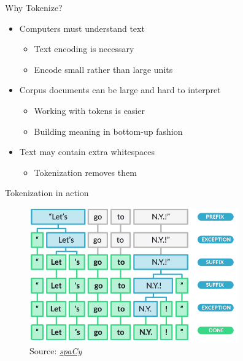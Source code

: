 \begin{vbframe}{Why Tokenize?}

\vfill

\begin{itemize}
	\item Computers must understand text
		\begin{itemize}
			\item Text encoding is necessary
			\item Encode small rather than large units
		\end{itemize}
	\item Corpus documents can be large and hard to interpret
		\begin{itemize}
			\item Working with tokens is easier
			\item Building meaning in bottom-up fashion
		\end{itemize}
	\item Text may contain extra whitespaces
		\begin{itemize}
			\item Tokenization removes them
		\end{itemize}
\end{itemize}

\vfill

\end{vbframe}


\begin{vbframe}{Tokenization in action}

\vfill

	\begin{figure}
		\centering
		\includegraphics[width = 9cm]{figure/spacy_tok}\\ 
		\footnotesize{Source:} \href{https://spacy.io/usage/linguistic-features}{\footnotesize \it spaCy}
	\end{figure}

\vfill

\end{vbframe}

